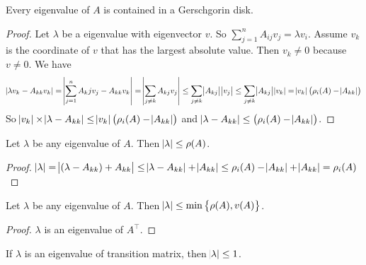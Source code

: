 \begin{theorem}
    Every eigenvalue of $A$ is contained in a Gerschgorin disk.    
\end{theorem}
\begin{proof}
    Let $\lambda$ be a eigenvalue with eigenvector $v$. So $\displaystyle \sum_{j=1}^n A_{ij} v_j = \lambda v_i$. Assume $v_k$ is the coordinate of $v$ that has the largest absolute value. Then $v_k \neq 0$ because $v \neq 0$. We have
    \begin{equation*}
        \begin{aligned}
            \abs{\lambda v_k - A_{kk} v_k} = \abs{\sum_{j=1}^n A_kj v_j - A_{kk} v_k} = \abs{\sum_{j \neq k} A_{kj} v_j} \leq \sum_{j \neq k} \abs{A_{kj}} \abs{v_j} \leq \sum_{j \neq k} \abs{A_{kj}} \abs{v_k} = \abs{v_k} \left(\rho_i (A) - \abs{A_{kk}} \right)
        \end{aligned}
    \end{equation*}
    So $\abs{v_k} \times \abs{\lambda - A_{kk} } \leq \abs{v_k} \left(\rho_i (A) - \abs{A_{kk}} \right)$ and $\abs{\lambda - A_{kk} } \leq \left(\rho_i (A) - \abs{A_{kk}} \right)$.
\end{proof}

\begin{theorem}
    Let $\lambda$ be any eigenvalue of $A$. Then $\abs{\lambda} \leq \rho(A)$.
\end{theorem}
\begin{proof}
    $\displaystyle \abs{\lambda} = \abs{(\lambda - A_{kk}) + A_{kk}} \leq \abs{\lambda - A_{kk}} + \abs{A_{kk}} \leq \rho_i (A) - \abs{A_{kk}}  + \abs{A_{kk}}  = \rho_i (A)$
\end{proof}

\begin{theorem}
    Let $\lambda$ be any eigenvalue of $A$. Then $\abs{\lambda} \leq \min \set{\rho(A), v(A)}$.
\end{theorem}
\begin{proof}
    $\lambda$ is an eigenvalue of $A^\top$.
\end{proof}

\begin{theorem}
    If $\lambda$ is an eigenvalue of transition matrix, then $\abs{\lambda} \leq 1$.
\end{theorem}

